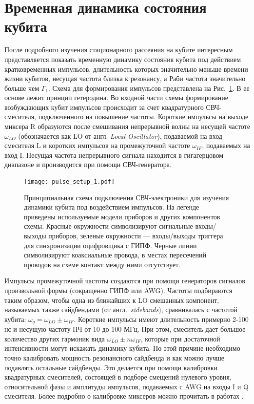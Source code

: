 \section{Временная динамика состояния кубита}
После подробного изучения стационарного рассеяния на кубите интересным представляется показать временную динамику состояния кубита под действием кратковременных импульсов, длительность которых значительно меньше времени жизни кубитов, несущая частота близка к резонансу, а Раби частота значительно больше чем $\Gamma_1$. Схема для формирования импульсов представлена на Рис.~\ref{fig: pulse_setup_1}. В ее основе лежит принцип гетеродина. Во входной части схемы  формирование возбуждающих кубит импульсов происходит за счет квадратурного СВЧ-смесителя, подключенного на повышение частоты. Короткие импульсы на выходе миксера R образуются после смешивания непрерывной волны на несущей частоте $\omega_{LO}$ (обозначается как LO от англ. \textit{Local Oscillator}), подаваемой на вход смесителя L и коротких импульсов на промежуточной частоте $\omega_{IF}$, подаваемых на вход I. Несущая частота непрерывного сигнала находится в гигагерцовом диапазоне и производится при помощи СВЧ-генератора.  
\begin{figure}[hbt]
	\centering
	\texttt{[image: pulse\_setup\_1.pdf]}
	\caption[Схема для изучения динамики кубита под воздействием коротких импульсов]{Принципиальная схема подключения СВЧ-электроники для изучения динамики кубита под воздействием импульсов. На легенде приведены используемые модели приборов и других компонентов схемы. Красные окружности символизируют сигнальные входы/выходы приборов, зеленые окружности --- входы/выходы триггера для синхронизации оцифровщика с ГИПФ. Черные линии символизируют коаксиальные провода, в местах пересечений проводов на схеме контакт между ними отсутствует. }
	\label{fig: pulse_setup_1}
\end{figure} 
Импульсы промежуточной частоты создаются при помощи генераторов сигналов произвольной формы (сокращенно ГИПФ или AWG). Частоты подбираются таким образом, чтобы одна из ближайших к LO смешанных компонент, называемых также сайдбендами (от англ.~\textit{sidebands}), сравнивалась с частотой кубита: $\omega_q = \omega_{LO} \pm \omega_{IF}$. Короткие импульсы имеют длительность примерно 2-100 нс и несущую частоту ПЧ от 10 до 100 МГц. При этом, смеситель дает большое количество других гармоник вида $\omega_{LO} \pm n\omega_{IF}$, которые при достаточной интенсивности могут искажать динамику кубита. По этой причине необходимо точно калибровать мощность резонансного сайдбенда и как можно лучше подавлять остальные сайдбенды. Это делается при помощи калибровки квадратурных смесителей, состоящей в подборе смещений нулевого уровня, относительной фазы и амплитуды импульсов, подаваемых с AWG на входы I и Q смесителя. Более подробно о калибровке миксеров можно прочитать в работах \cite{Schneider2015, jeffrey2014fast}.

